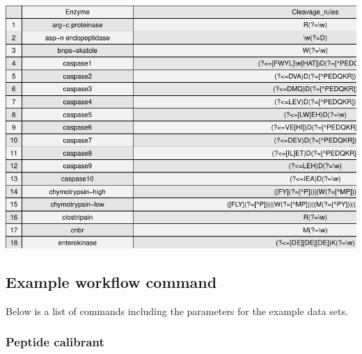\documentclass[
]{article}
\begin{document}
\includegraphics{README_files/figure-latex/unnamed-chunk-13-1.pdf}

\hypertarget{example-workflow-command}{%
\subsection{Example workflow command}\label{example-workflow-command}}

Below is a list of commands including the parameters for the example
data sets.

\hypertarget{peptide-calibrant}{%
\subsubsection{Peptide calibrant}\label{peptide-calibrant}}
\end{document}
